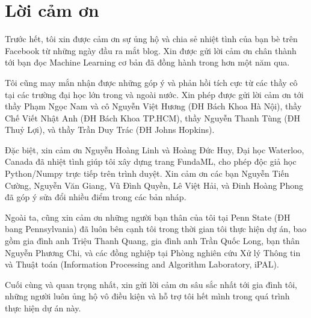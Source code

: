 



\section{Lời cảm ơn}
Trước hết, tôi xin được cảm ơn sự ủng hộ và chia sẻ nhiệt tình của bạn bè trên  Facebook từ những ngày đầu ra mắt blog. Xin được gửi lời cảm ơn chân thành tới bạn đọc Machine Learning cơ bản đã đồng hành trong hơn một năm qua. 

Tôi cũng may mắn nhận được những góp ý và phản hồi tích cực từ các thầy cô
tại các trường đại học lớn trong và ngoài nước. Xin phép được gửi lời cảm ơn
tới thầy Phạm Ngọc Nam và cô Nguyễn Việt Hương (ĐH Bách Khoa Hà Nội), thầy Chế
Viết Nhật Anh (ĐH Bách Khoa TP.HCM), thầy Nguyễn Thanh Tùng (ĐH Thuỷ Lợi),
và thầy Trần Duy Trác (ĐH Johns Hopkins).

Đặc biệt, xin cảm ơn Nguyễn Hoàng Linh và Hoàng Đức Huy, Đại học Waterloo,
Canada đã nhiệt tình giúp tôi xây dựng trang FundaML, cho phép độc giả
 học Python/Numpy trực tiếp trên trình duyệt. Xin cảm ơn các bạn Nguyễn
Tiến Cường, Nguyễn Văn Giang, Vũ Đình Quyền, Lê Việt Hải, và Đinh Hoàng Phong đã
góp ý sửa đổi nhiều điểm trong các bản nháp.

Ngoài ta, cũng xin cảm ơn những người bạn thân của tôi tại Penn State
(ĐH bang Pennsylvania) đã luôn bên cạnh tôi trong thời gian tôi thực hiện dự án,
bao gồm gia đình anh Triệu Thanh Quang, gia đình anh Trần Quốc Long, bạn thân
Nguyễn Phương Chi, và các đồng nghiệp tại Phòng nghiên cứu Xử lý Thông tin và
Thuật toán (Information Processing and Algorithm Laboratory, iPAL).

Cuối cùng và quan trọng nhất, xin gửi lời cảm ơn sâu sắc nhất tới gia đình tôi,
những người luôn ủng hộ vô điều kiện và hỗ trợ tôi hết mình trong quá trình thực
hiện dự án này.






